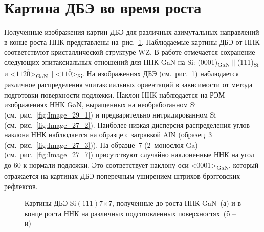 \section{Картина ДБЭ во время роста}\label{sec:ch4/sec3}

Полученные изображения картин ДБЭ для различных азимутальных направлений в
конце роста ННК представлены на~рис.~\cref{fig:Image_29}. Наблюдаемые картины
ДБЭ от ННК соответствуют кристаллической структуре WZ. В работе
\cite{Wierzbicka2013} отмечается сохранение следующих эпитаксиальных отношений
для ННК GaN на Si:
(0001)\textsubscript{GaN}\(\parallel\)(111)\textsubscript{Si} и
<\(112\overline{0}\)>\textsubscript{GaN}\(\parallel\)<\(11\overline{0}\)>\textsubscript{Si}.
На изображениях ДБЭ (см.~рис.~\cref{fig:Image_29}) наблюдается различное
распределения эпитаксиальных ориентаций в зависимости от метода подготовки
поверхности подложки. Наклон ННК наблюдается на РЭМ изображениях ННК GaN,
выращенных на необработанном Si (см.~рис.~\cref{fig:Image_29_1}) и
предварительно нитридированном Si (см.~рис.~\cref{fig:Image_27_2}). Наиболее
низкая дисперсия распределения углов наклона ННК наблюдается на образце с
затравкой AlN (образец~3 (см.~рис.~\cref{fig:Image_27_3})). На образце~7
(2~монослоя Ga) (см.~рис.~\cref{fig:Image_27_7}) присутствуют случайно
наклоненные ННК на угол до 60{\textdegree} к нормали подложки. Это
соответствует наклону оси <0001>\textsubscript{GaN}, который отражается на
картинах ДБЭ поперечным уширением штрихов брэгговских рефлексов.

\begin{figure}[ht]   \caption{Картины ДБЭ
Si\((111)7\)\(\times\)\(7\), полученные до роста ННК GaN~(а) и в конце роста
ННК на различных подготовленных поверхностях~(б -- и)}\label{fig:Image_29}
\end{figure}

